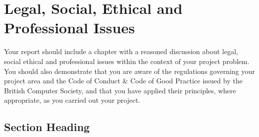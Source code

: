 \chapter{Legal, Social, Ethical and Professional Issues}
\label{chap:lsesp}

Your report should include a chapter with a reasoned discussion about legal, social ethical and professional issues within the context of your project problem. You should also demonstrate that you are aware of the regulations governing your project area and the Code of Conduct \& Code of Good Practice issued by the British Computer Society, and that you have applied their principles, where appropriate, as you carried out your project.

\section{Section Heading}
